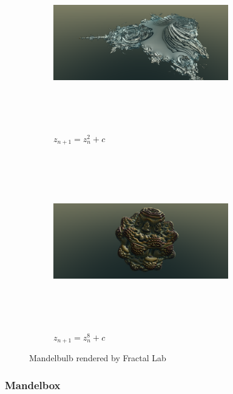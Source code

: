 \begin{figure}[h!tbp]
 \begin{subfigure}{0.49\hsize}
   \begin{center}
    \includegraphics[width=3in, height=3in, keepaspectratio]{../img/fractal/mandelbulb2.pdf}
    \caption{$z_{n + 1} = z_n^2 + c$}
    \label{fig:mandelbulb2}
   \end{center}
 \end{subfigure}
 \hspace*{\fill}
 \begin{subfigure}{0.49\hsize}
   \begin{center}
    \includegraphics[width=3in, height=3in, keepaspectratio]{../img/fractal/mandelbulb8.pdf}
    \caption{$z_{n+1} = z_n^8 + c$}
    \label{fig:mandelbulb8}
   \end{center}
 \end{subfigure}
 \caption{Mandelbulb rendered by Fractal Lab}
\end{figure}

\subsubsection{Mandelbox}

